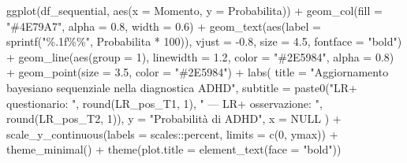 \documentclass[
  letterpaper,
  DIV=11,
  numbers=noendperiod,
  oneside]{scrreprt}
\newenvironment{Shaded}{\begin{snugshade}}{\end{snugshade}}
\newcommand{\AttributeTok}[1]{\textcolor[rgb]{0.40,0.45,0.13}{#1}}
\newcommand{\ConstantTok}[1]{\textcolor[rgb]{0.56,0.35,0.01}{#1}}
\newcommand{\DecValTok}[1]{\textcolor[rgb]{0.68,0.00,0.00}{#1}}
\newcommand{\FloatTok}[1]{\textcolor[rgb]{0.68,0.00,0.00}{#1}}
\newcommand{\FunctionTok}[1]{\textcolor[rgb]{0.28,0.35,0.67}{#1}}
\newcommand{\NormalTok}[1]{\textcolor[rgb]{0.00,0.23,0.31}{#1}}
\newcommand{\SpecialCharTok}[1]{\textcolor[rgb]{0.37,0.37,0.37}{#1}}
\newcommand{\StringTok}[1]{\textcolor[rgb]{0.13,0.47,0.30}{#1}}
\theoremstyle{definition}
\theoremstyle{plain}
\theoremstyle{definition}
\theoremstyle{remark}
\begin{document}
\begin{tcolorbox}
\begin{Shaded}
\begin{Highlighting}[]
\FunctionTok{ggplot}\NormalTok{(df\_sequential, }\FunctionTok{aes}\NormalTok{(}\AttributeTok{x =}\NormalTok{ Momento, }\AttributeTok{y =}\NormalTok{ Probabilita)) }\SpecialCharTok{+}
  \FunctionTok{geom\_col}\NormalTok{(}\AttributeTok{fill =} \StringTok{"\#4E79A7"}\NormalTok{, }\AttributeTok{alpha =} \FloatTok{0.8}\NormalTok{, }\AttributeTok{width =} \FloatTok{0.6}\NormalTok{) }\SpecialCharTok{+}
  \FunctionTok{geom\_text}\NormalTok{(}\FunctionTok{aes}\NormalTok{(}\AttributeTok{label =} \FunctionTok{sprintf}\NormalTok{(}\StringTok{"\%.1f\%\%"}\NormalTok{, Probabilita }\SpecialCharTok{*} \DecValTok{100}\NormalTok{)), }
            \AttributeTok{vjust =} \SpecialCharTok{{-}}\FloatTok{0.8}\NormalTok{, }\AttributeTok{size =} \FloatTok{4.5}\NormalTok{, }\AttributeTok{fontface =} \StringTok{"bold"}\NormalTok{) }\SpecialCharTok{+}
  \FunctionTok{geom\_line}\NormalTok{(}\FunctionTok{aes}\NormalTok{(}\AttributeTok{group =} \DecValTok{1}\NormalTok{), }\AttributeTok{linewidth =} \FloatTok{1.2}\NormalTok{, }\AttributeTok{color =} \StringTok{"\#2E5984"}\NormalTok{, }\AttributeTok{alpha =} \FloatTok{0.8}\NormalTok{) }\SpecialCharTok{+}
  \FunctionTok{geom\_point}\NormalTok{(}\AttributeTok{size =} \FloatTok{3.5}\NormalTok{, }\AttributeTok{color =} \StringTok{"\#2E5984"}\NormalTok{) }\SpecialCharTok{+}
  \FunctionTok{labs}\NormalTok{(}
    \AttributeTok{title =} \StringTok{"Aggiornamento bayesiano sequenziale nella diagnostica ADHD"}\NormalTok{,}
    \AttributeTok{subtitle =} \FunctionTok{paste0}\NormalTok{(}\StringTok{"LR+ questionario: "}\NormalTok{, }\FunctionTok{round}\NormalTok{(LR\_pos\_T1, }\DecValTok{1}\NormalTok{), }
                     \StringTok{" — LR+ osservazione: "}\NormalTok{, }\FunctionTok{round}\NormalTok{(LR\_pos\_T2, }\DecValTok{1}\NormalTok{)),}
    \AttributeTok{y =} \StringTok{"Probabilità di ADHD"}\NormalTok{,}
    \AttributeTok{x =} \ConstantTok{NULL}
\NormalTok{  ) }\SpecialCharTok{+}
  \FunctionTok{scale\_y\_continuous}\NormalTok{(}\AttributeTok{labels =}\NormalTok{ scales}\SpecialCharTok{::}\NormalTok{percent, }\AttributeTok{limits =} \FunctionTok{c}\NormalTok{(}\DecValTok{0}\NormalTok{, ymax)) }\SpecialCharTok{+}
  \FunctionTok{theme\_minimal}\NormalTok{() }\SpecialCharTok{+}
  \FunctionTok{theme}\NormalTok{(}\AttributeTok{plot.title =} \FunctionTok{element\_text}\NormalTok{(}\AttributeTok{face =} \StringTok{"bold"}\NormalTok{))}
\end{Highlighting}
\end{Shaded}

\begin{figure}[H]


\end{figure}
\end{tcolorbox}
\end{document}
